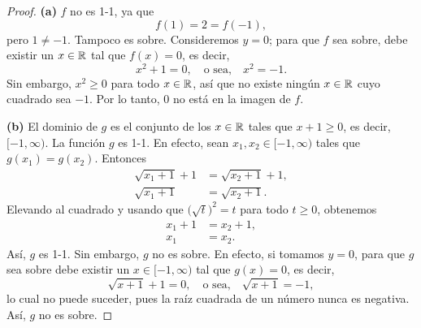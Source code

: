 \documentclass[12pt,a4paper]{article}
\begin{document}
    \begin{proof}
        \textbf{(a)} $f$ no es 1-1, ya que
        \begin{equation*}
            f(1)=2=f(-1),
        \end{equation*}
        pero $1\neq-1$. Tampoco es sobre. Consideremos $y=0$; para que $f$ sea sobre, debe existir un $x\in\mathbb{R}$ tal que $f(x)=0$, es decir,
        \begin{equation*}
            x^{2}+1=0,\quad\text{o sea,}\quad x^{2}=-1.
        \end{equation*}
        Sin embargo, $x^{2}\geq0$ para todo $x\in\mathbb{R}$, así que no existe ningún $x\in\mathbb{R}$ cuyo cuadrado sea $-1$. Por lo tanto, $0$ no está en la imagen de $f$.

        \textbf{(b)} El dominio de $g$ es el conjunto de los $x\in\mathbb{R}$ tales que $x+1\geq0$, es decir, $[-1,\infty)$. La función $g$ es 1-1. En efecto, sean $x_{1},x_{2}\in[-1,\infty)$ tales que $g(x_{1})=g(x_{2})$. Entonces
        \begin{align*}
            \sqrt{x_{1}+1}+1&=\sqrt{x_{2}+1}+1,\\
            \sqrt{x_{1}+1}&=\sqrt{x_{2}+1}.
        \end{align*}
        Elevando al cuadrado y usando que $\bigl(\sqrt{t}\bigr)^{2}=t$ para todo $t\geq0$, obtenemos
        \begin{align*}
            x_{1}+1&=x_{2}+1,\\
            x_{1}&=x_{2}.
        \end{align*}
        Así, $g$ es 1-1. Sin embargo, $g$ no es sobre. En efecto, si tomamos $y=0$, para que $g$ sea sobre debe existir un $x\in[-1,\infty)$ tal que $g(x)=0$, es decir,
        \begin{equation*}
            \sqrt{x+1}+1=0,\quad\text{o sea,}\quad\sqrt{x+1}=-1,
        \end{equation*}
        lo cual no puede suceder, pues la raíz cuadrada de un número nunca es negativa. Así, $g$ no es sobre.


\end{proof}
\end{document}

